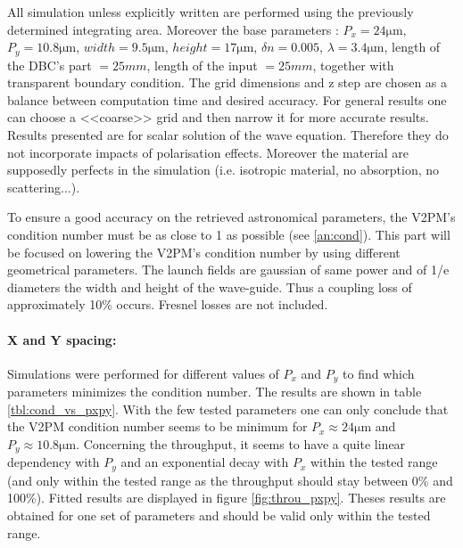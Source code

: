 All simulation unless explicitly written are performed using the previously determined integrating area. Moreover the base parameters : $P_x=24\si{\micro\meter}$, $P_y=10.8\si{\micro\meter}$,
$width=9.5\si{\micro\meter}$, $height=17\si{\micro\meter}$, $\delta n
= 0.005$, $\lambda=3.4\si{\micro\meter}$, length of the DBC's part $= 25mm$, length of the input $=25mm$, together with transparent boundary
condition. The grid dimensions and z step are chosen as a balance between computation time and desired accuracy. For general results one can
choose a <<coarse>> grid and then narrow it for more accurate results.
Results presented are for scalar solution of the wave equation. Therefore
they do not incorporate impacts of polarisation effects. Moreover the material are supposedly
perfects in the simulation (i.e. isotropic material, no absorption, no scattering...).


To ensure a good accuracy on the retrieved astronomical parameters,
the V2PM's condition number must be as close to 1 as possible (see
\ref{an:cond}). This part will be focused on lowering the V2PM's
condition number by using different geometrical parameters. 
The launch fields are gaussian of same power and of 1/e diameters the
width and height of the wave-guide. Thus a coupling loss of
approximately 10\% occurs. Fresnel losses are not included.

\paragraph{X and Y spacing:}
Simulations were performed for different values of $P_x$ and $P_y$ to
find which parameters minimizes the condition number. The results are
shown in table \ref{tbl:cond_vs_pxpy}. With the few tested parameters
one can only conclude that the V2PM condition number seems to be minimum for $P_x \approx 24 \si{\micro\meter}$ and $P_y \approx
10.8 \si{\micro\meter}$. Concerning the throughput, it seems to have a
quite linear dependency with $P_y$ and an exponential decay with $P_x$ within the tested
range (and only within the tested range as the throughput should stay between 0\% and 100\%). Fitted results are displayed in figure
\ref{fig:throu_pxpy}. Theses results are obtained for one set of
parameters and should be valid only within the tested range.

